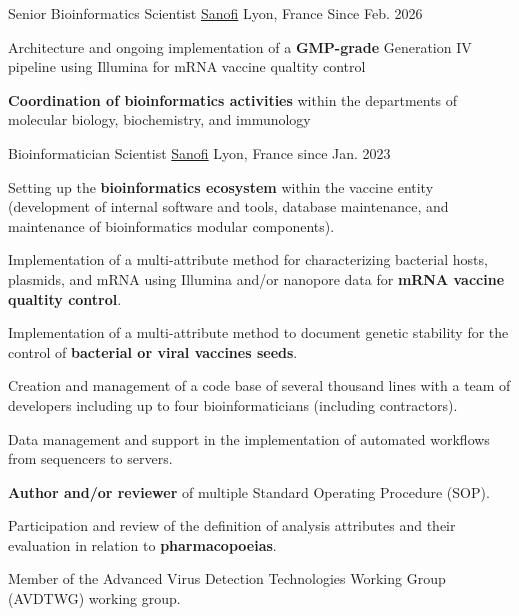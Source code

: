 

\begin{cventries}

 \cventry
    {Senior Bioinformatics Scientist} %
    {\href{https://www.sanofi.com/en}{Sanofi}} %
    {Lyon, France} %
    {Since Feb. 2026} %
    {
      \begin{cvitems} %
        \item {Architecture and ongoing implementation of a \textbf{GMP-grade} Generation IV pipeline using Illumina for mRNA vaccine qualtity control}
        \item {\textbf{Coordination of bioinformatics activities} within the departments of molecular biology, biochemistry, and immunology}
      \end{cvitems}
    }

 \cventry
    {Bioinformatician Scientist} %
    {\href{https://www.sanofi.com/en}{Sanofi}} %
    {Lyon, France} %
    {since Jan. 2023} %
    {
      \begin{cvitems} %
        \item {Setting up the \textbf{bioinformatics ecosystem} within the vaccine entity (development of internal software and tools, database maintenance, and maintenance of bioinformatics modular components).}
        \item {Implementation of a multi-attribute method for characterizing bacterial hosts, plasmids, and mRNA using Illumina and/or nanopore data for \textbf{mRNA vaccine qualtity control}.}
        \item {Implementation of a multi-attribute method to document genetic stability for the control of \textbf{bacterial or viral vaccines seeds}.}
        \item {Creation and management of a code base of several thousand lines with a team of developers including up to four bioinformaticians (including contractors).}
        \item {Data management and support in the implementation of automated workflows from sequencers to servers.}
        \item {\textbf{Author and/or reviewer} of multiple Standard Operating Procedure (SOP).}
        \item {Participation and review of the definition of analysis attributes and their evaluation in relation to \textbf{pharmacopoeias}.}     
        \item {Member of the Advanced Virus Detection Technologies Working Group (AVDTWG) working group.}     
      \end{cvitems}
    }


\end{cventries}
